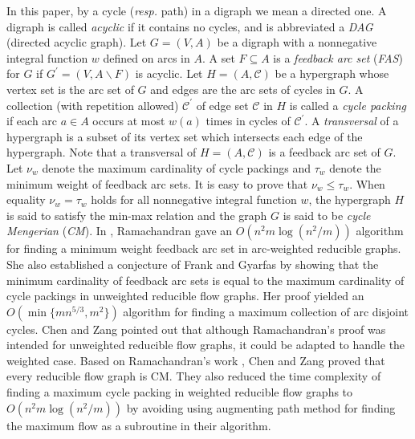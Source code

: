 \documentclass[11pt]{article}
\begin{document}
In this paper, by a cycle (\emph{resp.} path) in a digraph we mean a directed one. A digraph is called \emph{acyclic} if it contains no cycles, and is abbreviated a \emph{DAG} (directed acyclic graph). Let $G=(V,A)$ be a digraph with a nonnegative integral function $w$ defined on arcs in $A$. A set $F\subseteq A$ is a \emph{feedback arc set} (\emph{FAS}) for $G$ if $G^\prime=(V,A\backslash F)$ is acyclic. Let $H=(A,\mathcal{C})$ be a hypergraph whose vertex set is the arc set of $G$ and edges are the arc sets of cycles in $G$. A collection (with repetition allowed) $\mathcal{C}^\prime$ of edge set $\mathcal{C}$ in $H$ is called a \emph{cycle packing} if each arc $a\in A$ occurs at most $w(a)$ times in cycles of $\mathcal{C}^\prime$. A \emph{transversal} of a hypergraph is a subset of its vertex set which intersects each edge of the hypergraph. Note that a transversal of $H=(A,\mathcal{C})$ is a feedback arc set of $G$. Let $\nu_w$ denote the maximum cardinality of cycle packings and $\tau_w$ denote the minimum weight of feedback arc sets. It is easy to prove that $\nu_w\leq\tau_w$. When equality $\nu_w=\tau_w$ holds for all nonnegative integral function $w$, the hypergraph $H$ is said to satisfy the min-max relation and the graph $G$ is said to be \emph{cycle Mengerian} (\emph{CM}). In \cite{Rama1}, Ramachandran gave an $O(n^2m\log(n^2 / m))$ algorithm for finding a minimum weight feedback arc set in arc-weighted reducible graphs. She \cite{Rama2} also established a conjecture of Frank and Gyarfas \cite{FraG} by showing that the minimum cardinality of feedback arc sets is equal to the maximum cardinality of cycle packings  in unweighted reducible flow graphs. Her proof yielded an $O(\min\{mn^{5/3},m^2\})$ algorithm for finding a maximum collection of arc disjoint cycles. Chen and Zang \cite{CheZ} pointed out that although Ramachandran's proof \cite{Rama2} was intended for unweighted reducible flow graphs, it could be adapted to handle the weighted case. Based on Ramachandran's work \cite{Rama1,Rama2}, Chen and Zang proved that every reducible flow graph is CM. They also reduced the time complexity of finding a maximum cycle packing in weighted reducible flow graphs to $O(n^2 m\log(n^2/m))$  by avoiding using augmenting path method for finding the maximum flow as a subroutine in their algorithm. 
\end{document}
